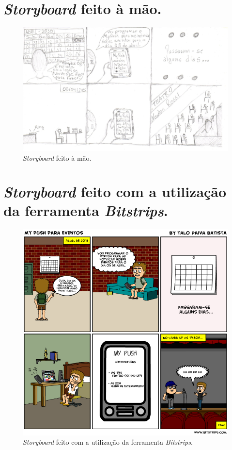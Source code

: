 \begin{anexosenv}

\partanexos

\chapter{\textit{Storyboard} feito à mão.}

 \begin{figure}[!htbp]
    \centering
    \includegraphics[scale=0.2]{editaveis/figuras/storyboard_papel}
    \caption{\textit{Storyboard} feito à mão.}
    \label{storyboard_papel}
  \end{figure}

\chapter{\textit{Storyboard} feito com a utilização da ferramenta \textit{Bitstrips}.}

 \begin{figure}[!htbp]
    \centering
    \includegraphics[scale=0.5]{editaveis/figuras/storyboard_ferramenta}
    \caption{\textit{Storyboard} feito com a utilização da ferramenta \textit{Bitstrips}.}
    \label{storyboard_ferramenta}
  \end{figure}


\end{anexosenv}
